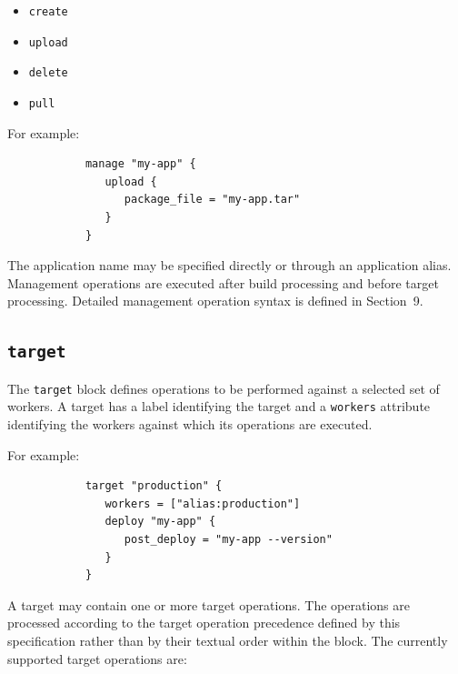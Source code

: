 \documentclass[11pt,a4paper]{article}
\begin{document}
    \begin{itemize}
        \item \texttt{create}
        \item \texttt{upload}
        \item \texttt{delete}
        \item \texttt{pull}
    \end{itemize}

    For example:

    \begin{center}
        \begin{verbatim}
            manage "my-app" {
               upload {
                  package_file = "my-app.tar"
               }
            }
        \end{verbatim}
    \end{center}

    The application name may be specified directly or through an application alias.
    Management operations are executed after build processing and before target processing.
    Detailed management operation syntax is defined in Section~9.

    \subsection{\texttt{target}}\label{subsec:texttt{target}}

    The \texttt{target} block defines operations to be performed against a selected set of workers.
    A target has a label identifying the target and a \texttt{workers}
    attribute identifying the workers against which its operations are executed.

    For example:

    \begin{center}
        \begin{verbatim}
            target "production" {
               workers = ["alias:production"]
               deploy "my-app" {
                  post_deploy = "my-app --version"
               }
            }
        \end{verbatim}
    \end{center}

    A target may contain one or more target operations.
    The operations are processed according to the target operation precedence defined by this
    specification rather than by their textual order within the block.
    The currently supported target operations are:
\end{document}
